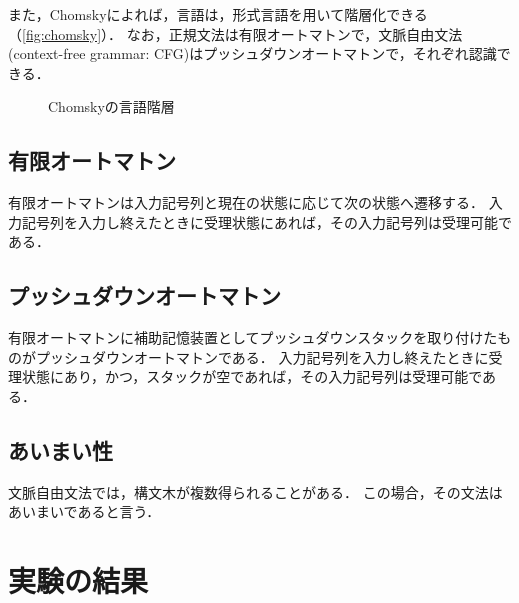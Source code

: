 \documentclass[uplatex, dvipdfmx, a4paper, twocolumn]{jsarticle}
\begin{document}
  また，Chomskyによれば，言語は，形式言語を用いて階層化できる（\autoref{fig:chomsky}）．
  なお，正規文法は有限オートマトンで，文脈自由文法(context-free grammar: CFG)はプッシュダウンオートマトンで，それぞれ認識できる．
  \begin{figure}[htpb]
    \centering
    \caption{Chomskyの言語階層\cite{jikken3c1}}
    \label{fig:chomsky}
  \end{figure}

    \subsection{有限オートマトン}
    有限オートマトンは入力記号列と現在の状態に応じて次の状態へ遷移する．
    入力記号列を入力し終えたときに受理状態にあれば，その入力記号列は受理可能である．

    \subsection{プッシュダウンオートマトン}
    有限オートマトンに補助記憶装置としてプッシュダウンスタックを取り付けたものがプッシュダウンオートマトンである．
    入力記号列を入力し終えたときに受理状態にあり，かつ，スタックが空であれば，その入力記号列は受理可能である．

    \subsection{あいまい性}
    文脈自由文法では，構文木が複数得られることがある．
    この場合，その文法はあいまいであると言う．

  \section{実験の結果}\label{kekka}
\end{document}
